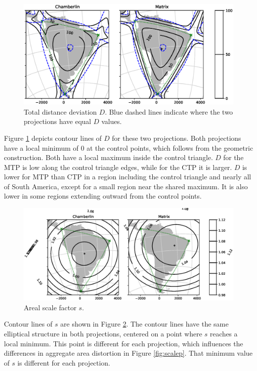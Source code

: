 \documentclass[]{interact}
\begin{document}
\begin{figure}
  \includegraphics[width=\textwidth]{South_America_Wall_Map_distance}
  \caption{Total distance deviation $D$. Blue dashed lines
  indicate where the two projections have equal $D$ values.}
  \label{fig:distance}
\end{figure}

Figure \ref{fig:distance} depicts contour lines of $D$ for these two
projections. Both projections have a local minimum of 0 at the control points,
which follows from the geometric construction. Both have a local maximum inside
the control triangle. $D$ for the MTP is low along the control
triangle edges, while for the CTP it is larger. $D$ is
lower for MTP than CTP in a region including the control triangle and
nearly all of South America, except for a small region near the shared maximum.
It is also lower in some regions extending outward from the control points.

\begin{figure}
  \includegraphics[width=\textwidth]{South_America_Wall_Map_scale}
  \caption{Areal scale factor $s$.}
  \label{fig:scale}
\end{figure}

Contour lines of $s$ are shown in Figure \ref{fig:scale}.
The contour lines have the same elliptical structure in both projections,
centered on a point where $s$ reaches a local minimum.
This point is different for each projection, which influences
the differences in aggregate area distortion in Figure \ref{fig:scalep}.
That minimum value of $s$ is different for each projection.
\end{document}
